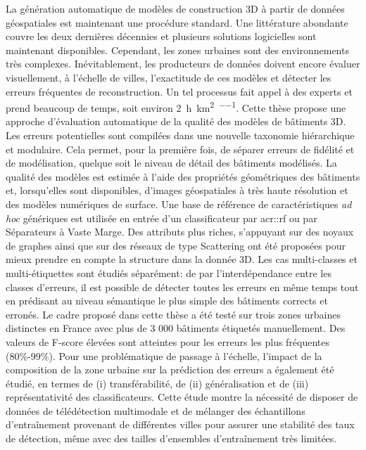 La génération automatique de modèles de construction 3D à partir de données géospatiales est maintenant une procédure standard.
Une littérature abondante couvre les deux dernières décennies et plusieurs solutions logicielles sont maintenant disponibles.
Cependant, les zones urbaines sont des environnements très complexes.
Inévitablement, les producteurs de données doivent encore évaluer visuellement, à l'échelle de villes, l'exactitude de ces modèles et détecter les erreurs fréquentes de reconstruction.
Un tel processus fait appel à des experts et prend beaucoup de temps, soit environ \SI[per-mode=repeated-symbol]{2}{\hour\per\km\squared\per\expert}.
Cette thèse propose une approche d'évaluation automatique de la qualité des modèles de bâtiments 3D.
Les erreurs potentielles sont compilées dans une nouvelle taxonomie hiérarchique et modulaire.
Cela permet, pour la première fois, de séparer erreurs de fidélité et de modélisation, quelque soit le niveau de détail des bâtiments modélisés.
La qualité des modèles est estimée à l'aide des propriétés géométriques des bâtiments et, lorsqu'elles sont disponibles, d'images géospatiales à très haute résolution et des modèles numériques de surface.
Une base de référence de caractéristiques \textit{ad hoc} génériques est utilisée en entrée d'un classificateur par \acrlong*{acr::rf} ou par Séparateurs à Vaste Marge.
Des attributs plus riches, s'appuyant sur des noyaux de graphes ainsi que sur des réseaux de type Scattering ont été proposées pour mieux prendre en compte la structure dans la donnée 3D.
Les cas multi-classes et multi-étiquettes sont étudiés séparément: de par l'interdépendance entre les classes d'erreurs, il est possible de détecter toutes les erreurs en même temps tout en prédisant au niveau sémantique le plus simple des bâtiments corrects et erronés.
Le cadre proposé dans cette thèse a été testé sur trois zones urbaines distinctes en France avec plus de 3 000 bâtiments étiquetés manuellement.
Des valeurs de F-score élevées sont atteintes pour les erreurs les plus fréquentes (80\%-99\%).
Pour une problématique de passage à l’échelle, l'impact de la composition de la zone urbaine sur la prédiction des erreurs a également été étudié, en termes de (i) transférabilité, de (ii) généralisation et de (iii) représentativité des classificateurs.
Cette étude montre la nécessité de disposer de données de télédétection multimodale et de mélanger des échantillons d'entraînement provenant de différentes villes pour assurer une stabilité des taux de détection, même avec des tailles d'ensembles d'entraînement très limitées.
